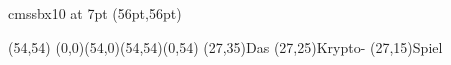 

\font\myfont cmssbx10 at 7pt
\PapierGroesse(56pt,56pt)




\begin{psfigur}(54,54)
\psPolygon[fuellfarbe=0.753,eckradius=5,linienstil=](0,0)(54,0)(54,54)(0,54)
\psNeueSchicht
\rpin(27,35){\myfont Das}
\rpin(27,25){\myfont Krypto-}
\rpin(27,15){\myfont Spiel}
\end{psfigur}
 
